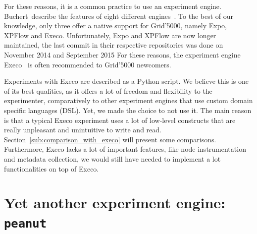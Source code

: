             For these reasons, it is a common practice to use an experiment engine. Buchert~\etal describe the features
            of eight different engines~\cite{buchert:hal-01087519}. To the best of our knowledge, only three offer a
            native support for Grid'5000, namely Expo, XPFlow and Execo. Unfortunately, Expo and XPFlow are now longer
            maintained, the last commit in their respective repositories was done on November 2014 and September 2015
            For these reasons, the experiment engine Execo~\cite{Imbert_2013} is often recommended to Grid'5000
            newcomers.

            Experiments with Execo are described as a Python script. We believe this is one of its best qualities, as it
            offers a lot of freedom and flexibility to the experimenter, comparatively to other experiment engines that
            use custom domain specific languages (DSL). Yet, we made the choice to not use it. The main reason is that a
            typical Execo experiment uses a lot of low-level constructs that are really unpleasant and unintuitive to
            write and read. Section~\ref{sub:comparison_with_execo} will present some comparisons. Furthermore, Execo
            lacks a lot of important features, like node instrumentation and metadata collection, \ie we would still
            have needed to implement a lot functionalities on top of Execo.

    \section{Yet another experiment engine: \texttt{peanut}}%
    \label{sec:peanut}
